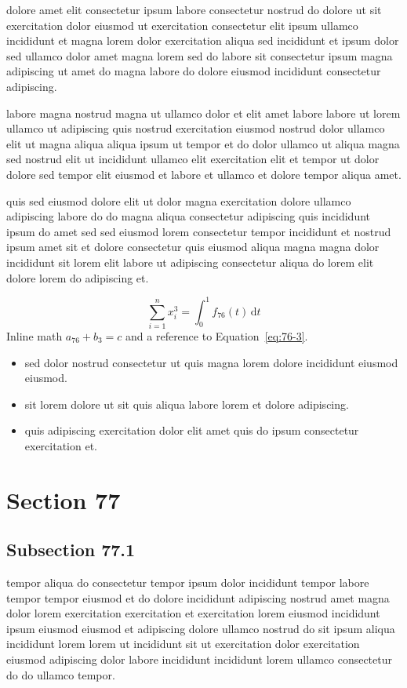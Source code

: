 \documentclass{article}
\begin{document}
dolore amet elit consectetur ipsum labore consectetur nostrud do dolore ut sit exercitation dolor eiusmod ut exercitation consectetur elit ipsum ullamco incididunt et magna lorem dolor exercitation aliqua sed incididunt et ipsum dolor sed ullamco dolor amet magna lorem sed do labore sit consectetur ipsum magna adipiscing ut amet do magna labore do dolore eiusmod incididunt consectetur adipiscing.

labore magna nostrud magna ut ullamco dolor et elit amet labore labore ut lorem ullamco ut adipiscing quis nostrud exercitation eiusmod nostrud dolor ullamco elit ut magna aliqua aliqua ipsum ut tempor et do dolor ullamco ut aliqua magna sed nostrud elit ut incididunt ullamco elit exercitation elit et tempor ut dolor dolore sed tempor elit eiusmod et labore et ullamco et dolore tempor aliqua amet.

quis sed eiusmod dolore elit ut dolor magna exercitation dolore ullamco adipiscing labore do do magna aliqua consectetur adipiscing quis incididunt ipsum do amet sed sed eiusmod lorem consectetur tempor incididunt et nostrud ipsum amet sit et dolore consectetur quis eiusmod aliqua magna magna dolor incididunt sit lorem elit labore ut adipiscing consectetur aliqua do lorem elit dolore lorem do adipiscing et.

\begin{equation}\label{eq:76-3}
  \sum_{i=1}^{n} x_i^{3} = \int_0^1 f_{76}(t)\,\mathrm{d}t
\end{equation}
Inline math $a_{76} + b_{3} = c$ and a reference to Equation~\eqref{eq:76-3}.

\begin{itemize}
  \item sed dolor nostrud consectetur ut quis magna lorem dolore incididunt eiusmod eiusmod.
  \item sit lorem dolore ut sit quis aliqua labore lorem et dolore adipiscing.
  \item quis adipiscing exercitation dolor elit amet quis do ipsum consectetur exercitation et.
\end{itemize}

\section{Section 77}\label{sec:77}
\subsection{Subsection 77.1}\label{sec:77-1}
tempor aliqua do consectetur tempor ipsum dolor incididunt tempor labore tempor tempor eiusmod et do dolore incididunt adipiscing nostrud amet magna dolor lorem exercitation exercitation et exercitation lorem eiusmod incididunt ipsum eiusmod eiusmod et adipiscing dolore ullamco nostrud do sit ipsum aliqua incididunt lorem lorem ut incididunt sit ut exercitation dolor exercitation eiusmod adipiscing dolor labore incididunt incididunt lorem ullamco consectetur do do ullamco tempor.
\end{document}
